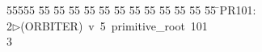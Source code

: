 %
%
\begin{tabbing}
55555 \= 55 \= 55 \= 55 \= 55 \= 55 \= 55 \= 55 \= 55 \= 55 \= 55 \= 55 \= 55 \= \>PR101:\\[0pt]
2\>$\triangleright$\>(ORBITER)\ v\ 5\ primitive\_root\ 101\\[0pt]
3\>\end{tabbing}
